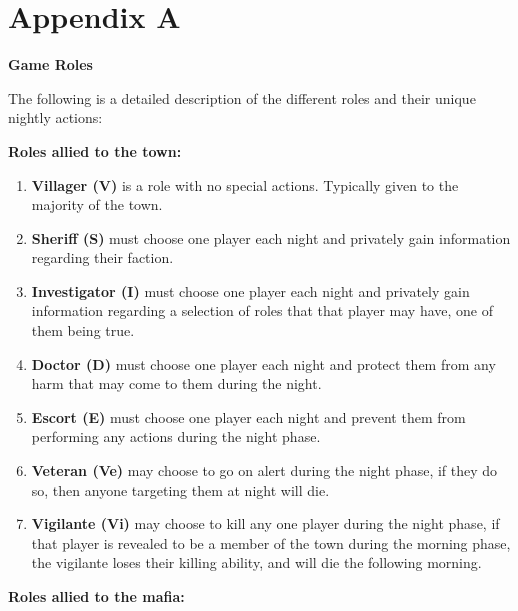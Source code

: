 \section{Appendix A}\label{app:A}
\begin{center}
	\textbf{Game Roles}
\end{center}
The following is a detailed description of the different roles and their unique
nightly actions:

\textbf{Roles allied to the town:}
\begin{enumerate}
	\item\textbf{Villager (V)} is a  role with no special actions. Typically
	      given
	      to the majority of the town.
	\item\textbf{Sheriff (S)} must choose one player each night and privately
	      gain
	      information regarding their faction.
	\item\textbf{Investigator (I)} must choose one player each night and
	      privately
	      gain information regarding a selection of roles that that player may have,
	      one of them being true.
	\item\textbf{Doctor (D)} must choose one player each night and protect them
	      from any harm that may come to them during the night.
	\item\textbf{Escort (E)} must choose one player each night and prevent them
	      from performing any actions during the night phase.
	\item\textbf{Veteran (Ve)} may choose to go on alert during the night
	      phase, if
	      they do so, then anyone targeting them at night will die.
	\item\textbf{Vigilante (Vi)} may choose to kill any one player during the
	      night
	      phase, if that player is revealed to be a member of the town during the
	      morning phase, the vigilante loses their killing ability, and will die the
	      following morning.
\end{enumerate}
\textbf{Roles allied to the mafia:}
